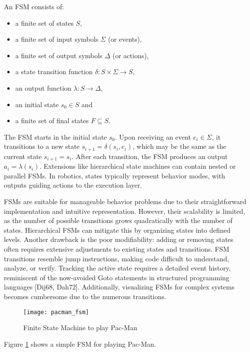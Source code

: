 An FSM consists of:

\begin{itemize}
  \item a finite set of states $S$,
  \item a finite set of input symbols $\Sigma$ (or events),
  \item a finite set of output symbols $\Delta$ (or actions),
  \item a state transition function $\delta: S \times \Sigma \rightarrow S$,
  \item an output function $\lambda: S \rightarrow \Delta$,
  \item an initial state $s_0 \in S$ and
  \item a finite set of final states $F \subseteq S$.
\end{itemize}

The FSM starts in the initial state $s_0$.
Upon receiving an event $e_i \in \Sigma$, it transitions to a new state $s_{i+1} = \delta(s_i, e_i)$, which may be the same as the current state $s_{i+1} = s_i$.
After each transition, the FSM produces an output $a_i = \lambda(s_i)$.
Extensions like hierarchical state machines can contain nested or parallel FSMs.
In robotics, states typically represent behavior modes, with outputs guiding actions to the execution layer.

FSMs are suitable for manageable behavior problems due to their straightforward implementation and intuitive representation.
However, their scalability is limited, as the number of possible transitions grows quadratically with the number of states.
Hierarchical FSMs can mitigate this by organizing states into defined levels.
Another drawback is the poor modifiability: adding or removing states often requires extensive adjustments to existing states and transitions.
FSM transitions resemble jump instructions, making code difficult to understand, analyze, or verify.
Tracking the active state requires a detailed event history, reminiscent of the now-avoided Goto statements in structured programming languages [Dij68, Dah72].
Additionally, visualizing FSMs for complex systems becomes cumbersome due to the numerous transitions.

\begin{figure}
  \centering
  \texttt{[image: pacman\_fsm]}

  \caption{Finite State Machine to play Pac-Man}%
  \label{fig:pacman_fsm}
\end{figure}

Figure \ref{fig:pacman_fsm} shows a simple FSM for playing Pac-Man.

